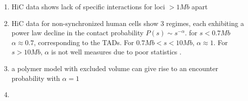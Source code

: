 \documentclass[12pt]{paper}
\begin{document}
\begin{enumerate}
\item HiC data shows lack of specific interactions for loci $>1Mb$ apart
\item HiC data for non-synchronized human cells show 3 regimes, each exhibiting a power law decline in the contact probability $P(s)\sim s^{-\alpha}$. for $s<0.7Mb$ $\alpha\approx0.7$, corresponding to the TADs. For $0.7Mb<s<10Mb$, $\alpha\approx1$. For $s>10Mb$, $\alpha$ is not well measures due to poor statistics \cite{lieberman2009comprehensive}.
\item a polymer model with excluded volume can give rise to an encounter probability with $\alpha=1$
\item 

\end{enumerate}


\end{document}
